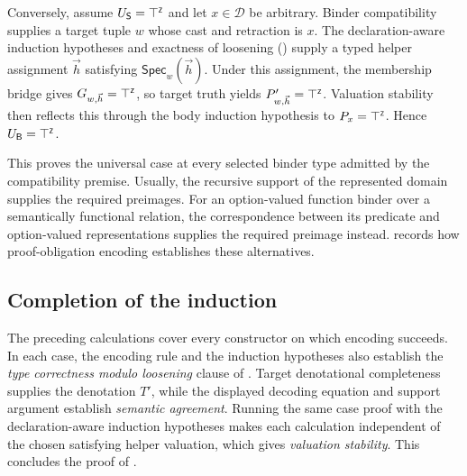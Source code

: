 Conversely, assume \(U_{\mathsf S}=\top^{\scriptscriptstyle{\mathsf{Z}}}\) and let \(x\in\mathcal D\) be arbitrary.
Binder compatibility supplies a target tuple \(w\) whose cast and retraction is \(x\).
The declaration-aware induction hypotheses and exactness of loosening () supply a typed helper assignment \(\vec{h}\) satisfying \(\mathsf{Spec}_w(\vec{h})\).
Under this assignment, the membership bridge gives \(G_{w,\vec{h}}=\top^{\scriptscriptstyle{\mathsf{Z}}}\), so target truth yields \(P'_{w,\vec{h}}=\top^{\scriptscriptstyle{\mathsf{Z}}}\).
Valuation stability then reflects this through the body induction hypothesis to \(P_x=\top^{\scriptscriptstyle{\mathsf{Z}}}\).
Hence \(U_{\mathsf B}=\top^{\scriptscriptstyle{\mathsf{Z}}}\).

This proves the universal case at every selected binder type admitted by the compatibility premise.
Usually, the recursive support of the represented domain supplies the required preimages.
For an option-valued function binder over a semantically functional relation,
the correspondence between its predicate and option-valued representations
supplies the required preimage instead.
 records how proof-obligation encoding establishes these alternatives.

\subsection{Completion of the induction}
The preceding calculations cover every constructor on which encoding succeeds.
In each case, the encoding rule and the induction hypotheses also establish the \emph{type correctness modulo loosening} clause of .
Target denotational completeness supplies the denotation \(T'\), while the displayed decoding equation and support argument establish \emph{semantic agreement}.
Running the same case proof with the declaration-aware induction hypotheses makes each calculation independent of the chosen satisfying helper valuation, which gives \emph{valuation stability}.
This concludes the proof of .
